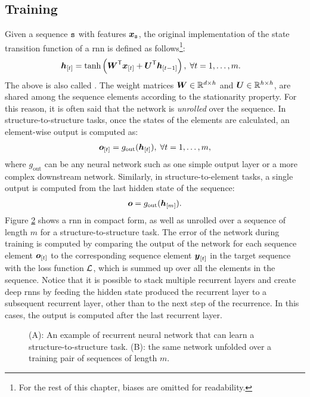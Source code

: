 \subsection{Training}
Given a sequence $\mathtt{s}$ with features $\Vector{x}_{\Seq{s}}$, the original implementation of the state transition function of a \gls{rnn} is defined as follows\footnote{For the rest of this chapter, biases are omitted for readability.}:
\begin{align*}
    \Elem{h}{t} &= \tanh\Par{\Matrix{W}^{\Transpose}\Elem{x}{t} + \Matrix{U}^{\Transpose}\Elem{h}{t-1}},\; \forall t=1, \ldots, m.
\end{align*}
The above is also called . The weight matrices $\Matrix{W} \in \Real^{d \times h}$ and $\Matrix{U} \in \Real^{h \times h}$, are shared among the sequence elements according to the stationarity property. For this reason, it is often said that the network is \emph{unrolled} over the sequence. In structure-to-structure tasks, once the states of the elements are calculated, an element-wise output is computed as:
\begin{align*}
    \Elem{o}{t} = g_{\mathrm{out}}(\Elem{h}{t}),\; \forall t=1, \ldots, m,
\end{align*}
where $g_{\mathrm{out}}$ can be any neural network such as one simple output layer or a more complex downstream network. Similarly, in structure-to-element tasks, a single output is computed from the last hidden state of the sequence:
\begin{align*}
    \Vector{o} = g_{\mathrm{out}}(\Elem{h}{m}).
\end{align*}
Figure \ref{fig:rnn-unfold} shows a \gls{rnn} in compact form, as well as unrolled over a sequence of length $m$ for a structure-to-structure task. The error of the network during training is computed by comparing the output of the network for each sequence element $\Elem{o}{t}$ to the corresponding sequence element $\Elem{y}{t}$ in the target sequence with the loss function $\mathcal{L}$, which is summed up over all the elements in the sequence. Notice that it is possible to stack multiple recurrent layers and create deep \glspl{rnn} by feeding the hidden state produced the recurrent layer to a subsequent recurrent layer, other than to the next step of the recurrence. In this cases, the output is computed after the last recurrent layer.
\begin{figure*}[h!]
    \begin{subfigure}[b]{0.4\linewidth}
        \centering
        \resizebox{.6\textwidth}{!}{}
        \caption{}
        \label{fig:rnn}
    \end{subfigure}
    \begin{subfigure}[b]{0.59\linewidth}
        \centering
        \resizebox{.8\textwidth}{!}{}
        \caption{}
        \label{fig:rnn-unfold}
    \end{subfigure}
    \caption{(A): An example of recurrent neural network that can learn a structure-to-structure task. (B): the same network unfolded over a training pair of sequences of length $m$.}
    \label{fig:rnn-example}
\end{figure*}
